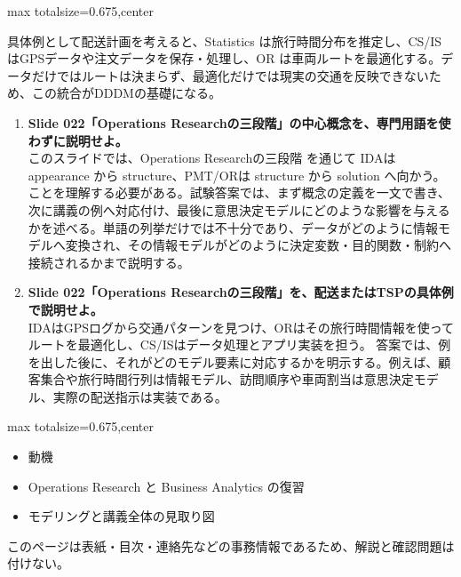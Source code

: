 \begin{adjustbox}{max totalsize={\textwidth}{0.675\textheight},center}
\begin{minipage}{\textwidth}
\begin{minipage}[t]{0.485\textwidth}
具体例として配送計画を考えると、Statistics は旅行時間分布を推定し、CS/IS はGPSデータや注文データを保存・処理し、OR は車両ルートを最適化する。データだけではルートは決まらず、最適化だけでは現実の交通を反映できないため、この統合がDDDMの基礎になる。\par
{}
\begin{enumerate}
\item \textbf{Slide 022「Operations Researchの三段階」の中心概念を、専門用語を使わずに説明せよ。}\\このスライドでは、Operations Researchの三段階 を通じて IDAは appearance から structure、PMT/ORは structure から solution へ向かう。 ことを理解する必要がある。試験答案では、まず概念の定義を一文で書き、次に講義の例へ対応付け、最後に意思決定モデルにどのような影響を与えるかを述べる。単語の列挙だけでは不十分であり、データがどのように情報モデルへ変換され、その情報モデルがどのように決定変数・目的関数・制約へ接続されるかまで説明する。
\item \textbf{Slide 022「Operations Researchの三段階」を、配送またはTSPの具体例で説明せよ。}\\IDAはGPSログから交通パターンを見つけ、ORはその旅行時間情報を使ってルートを最適化し、CS/ISはデータ処理とアプリ実装を担う。 答案では、例を出した後に、それがどのモデル要素に対応するかを明示する。例えば、顧客集合や旅行時間行列は情報モデル、訪問順序や車両割当は意思決定モデル、実際の配送指示は実装である。
\end{enumerate}
\end{minipage}
\end{minipage}
\end{adjustbox}

\clearpage
{}
\begin{adjustbox}{max totalsize={\textwidth}{0.675\textheight},center}
\begin{minipage}{\textwidth}\scriptsize
\begin{minipage}[t]{0.485\textwidth}
\begin{itemize}
\item 動機
\item Operations Research と Business Analytics の復習
\item モデリングと講義全体の見取り図
\end{itemize}
\end{minipage}\hfill
\begin{minipage}[t]{0.485\textwidth}
{\small このページは表紙・目次・連絡先などの事務情報であるため、解説と確認問題は付けない。}
\end{minipage}
\end{minipage}
\end{adjustbox}

